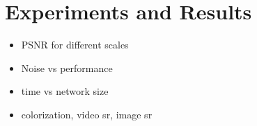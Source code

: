 \newpage
\section{Experiments and Results}
\label{sec:ExperimentsandResults}



\begin{itemize}
  \item PSNR for different scales
  \item Noise vs performance
  \item time vs network size
  \item colorization, video sr, image sr
\end{itemize}


